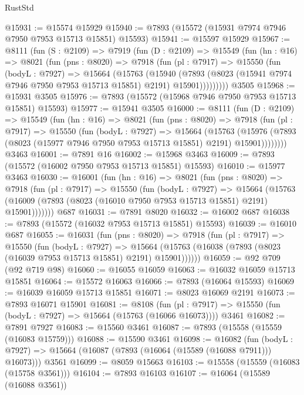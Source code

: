 \begin{lexlean}{RustStd}
\begin{coremodule}
@15931 := @15574 @15929
@15940 := @7893 (@15572 (@15931 @7974 @7946 @7950 @7953 @15713 @15851) @15593)
@15941 := @15597 @15929
@15967 := @8111
    (fun (S : @2109) =>
    @7919
      (fun (D : @2109) =>
      @15549
        (fun (hn : @16) =>
        @8021
          (fun (pns : @8020) =>
          @7918
            (fun (pl : @7917) =>
            @15550
              (fun (bodyL : @7927) =>
              @15664
                (@15763
                  (@15940
                    (@7893
                      (@8023 (@15941 @7974 @7946 @7950 @7953 @15713 @15851) @2191)
                      @15901)))))))))
    @3505
@15968 := @15931 @3505
@15976 := @7893 (@15572 (@15968 @7946 @7950 @7953 @15713 @15851) @15593)
@15977 := @15941 @3505
@16000 := @8111
    (fun (D : @2109) =>
    @15549
      (fun (hn : @16) =>
      @8021
        (fun (pns : @8020) =>
        @7918
          (fun (pl : @7917) =>
          @15550
            (fun (bodyL : @7927) =>
            @15664
              (@15763
                (@15976 (@7893 (@8023 (@15977 @7946 @7950 @7953 @15713 @15851) @2191) @15901))))))))
    @3463
@16001 := @7891 @16
@16002 := @15968 @3463
@16009 := @7893 (@15572 (@16002 @7950 @7953 @15713 @15851) @15593)
@16010 := @15977 @3463
@16030 := @16001
    (fun (hn : @16) =>
    @8021
      (fun (pns : @8020) =>
      @7918
        (fun (pl : @7917) =>
        @15550
          (fun (bodyL : @7927) =>
          @15664
            (@15763 (@16009 (@7893 (@8023 (@16010 @7950 @7953 @15713 @15851) @2191) @15901)))))))
    @687
@16031 := @7891 @8020
@16032 := @16002 @687
@16038 := @7893 (@15572 (@16032 @7953 @15713 @15851) @15593)
@16039 := @16010 @687
@16055 := @16031
    (fun (pns : @8020) =>
    @7918
      (fun (pl : @7917) =>
      @15550
        (fun (bodyL : @7927) =>
        @15664 (@15763 (@16038 (@7893 (@8023 (@16039 @7953 @15713 @15851) @2191) @15901))))))
@16059 := @92 @709 (@92 @719 @98)
@16060 := @16055 @16059
@16063 := @16032 @16059 @15713 @15851
@16064 := @15572 @16063
@16066 := @7893 (@16064 @15593)
@16069 := @16039 @16059 @15713 @15851
@16071 := @8023 @16069 @2191
@16073 := @7893 @16071 @15901
@16081 := @8108
    (fun (pl : @7917) => @15550 (fun (bodyL : @7927) => @15664 (@15763 (@16066 @16073))))
    @3461
@16082 := @7891 @7927
@16083 := @15560 @3461
@16087 := @7893 (@15558 (@15559 (@16083 @15759)))
@16088 := @15590 @3461
@16098 := @16082
    (fun (bodyL : @7927) => @15664 (@16087 (@7893 (@16064 (@15589 (@16088 @7911))) @16073)))
    @3561
@16099 := @8059 @15663
@16103 := @15558 (@15559 (@16083 (@15758 @3561)))
@16104 := @7893 @16103
@16107 := @16064 (@15589 (@16088 @3561))

\end{coremodule}
\end{lexlean}
